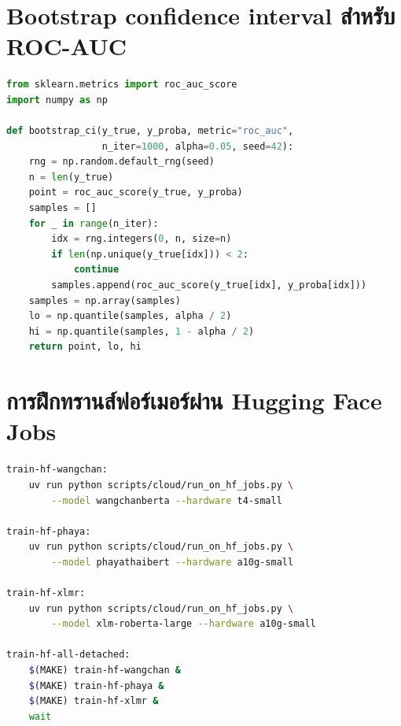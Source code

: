 \section{Bootstrap confidence interval สำหรับ ROC-AUC}
\begin{lstlisting}[language=Python,caption={src/evaluation/metrics.py -- bootstrap\_ci},label={lst:boot}]
from sklearn.metrics import roc_auc_score
import numpy as np

def bootstrap_ci(y_true, y_proba, metric="roc_auc",
                 n_iter=1000, alpha=0.05, seed=42):
    rng = np.random.default_rng(seed)
    n = len(y_true)
    point = roc_auc_score(y_true, y_proba)
    samples = []
    for _ in range(n_iter):
        idx = rng.integers(0, n, size=n)
        if len(np.unique(y_true[idx])) < 2:
            continue
        samples.append(roc_auc_score(y_true[idx], y_proba[idx]))
    samples = np.array(samples)
    lo = np.quantile(samples, alpha / 2)
    hi = np.quantile(samples, 1 - alpha / 2)
    return point, lo, hi
\end{lstlisting}

\section{การฝึกทรานส์ฟอร์เมอร์ผ่าน Hugging Face Jobs}
\begin{lstlisting}[language=bash,caption={Makefile -- เป้าหมายคลาวด์},label={lst:make}]
train-hf-wangchan:
	uv run python scripts/cloud/run_on_hf_jobs.py \
		--model wangchanberta --hardware t4-small

train-hf-phaya:
	uv run python scripts/cloud/run_on_hf_jobs.py \
		--model phayathaibert --hardware a10g-small

train-hf-xlmr:
	uv run python scripts/cloud/run_on_hf_jobs.py \
		--model xlm-roberta-large --hardware a10g-small

train-hf-all-detached:
	$(MAKE) train-hf-wangchan &
	$(MAKE) train-hf-phaya &
	$(MAKE) train-hf-xlmr &
	wait
\end{lstlisting}
